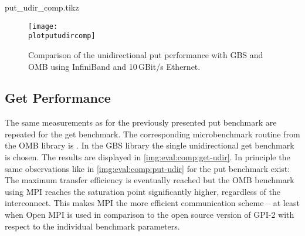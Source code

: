 \newcommand{\plotputudircomp}{put_udir_comp.tikz}
\begin{filecontents}{\plotputudircomp}

\newcommand{\csvombib}{result-omb/osu-ib-osu_put_bw.csv}
\newcommand{\csvombte}{result-omb/osu-te-osu_put_bw.csv}
\newcommand{\csvgaspiib}{result-ib/gbs_ubench_put_single_udir.csv}
\newcommand{\csvgaspite}{result-te/gbs_ubench_put_single_udir.csv}

\end{filecontents}

\begin{figure}[htb]
\centering
\texttt{[image: \\plotputudircomp]}
\caption{Comparison of the unidirectional put performance with \ac{GBS} and \ac{OMB} using InfiniBand and 10\,GBit/s Ethernet.}
\label{img:eval:comp:put-udir}
\end{figure}



\subsection{Get Performance}

The same measurements as for the previously presented put benchmark are repeated for the get benchmark. The corresponding microbenchmark routine from the \ac{OMB} library is . In the \ac{GBS} library the single unidirectional get benchmark is chosen. The results are displayed in \autoref{img:eval:comp:get-udir}. In principle the same observations like in \autoref{img:eval:comp:put-udir} for the put benchmark exist: The maximum transfer efficiency is eventually reached but the \ac{OMB} benchmark using \ac{MPI} reaches the saturation point significantly higher, regardless of the interconnect. This makes \ac{MPI} the more efficient communication scheme -- at least when Open MPI is used in comparison to the open source version of \ac{GPI}-2 with respect to the individual benchmark parameters.


